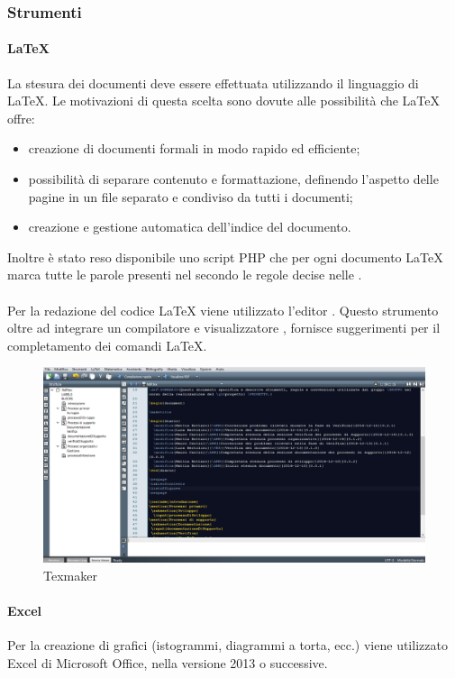 \subsubsection{Strumenti}
\label{sec:Strumenti}
 \paragraph{\LaTeX{}}
La stesura dei documenti deve essere effettuata utilizzando il linguaggio di  \LaTeX{}. Le motivazioni di questa scelta sono dovute alle possibilità che \LaTeX{}{} offre:
\begin{itemize}
	\item creazione di documenti formali in modo rapido ed efficiente;
	\item possibilità di separare contenuto e formattazione, definendo l'aspetto delle pagine in un file
 separato e condiviso da tutti i documenti;
	\item creazione e gestione automatica dell'indice del documento.
\end{itemize}
Inoltre è stato reso disponibile uno script PHP che per ogni documento \LaTeX{}{} marca tutte  le parole presenti nel \Gldoc{} secondo le regole decise nelle \NPdoc.
 \paragraph{}
Per la redazione del codice \LaTeX{}{} viene utilizzato l'editor . Questo
strumento oltre ad integrare un compilatore e visualizzatore , fornisce suggerimenti per il completamento dei comandi \LaTeX{}.
\begin{figure}[h]
\centering
\includegraphics[scale=0.4]{img/texm.png}
\caption{Texmaker}\label{sec:Figura3}
\end{figure}
 \paragraph{Excel}
Per la creazione di grafici (istogrammi, diagrammi a torta, ecc.) viene utilizzato Excel di Microsoft Office, nella versione 2013 o successive.